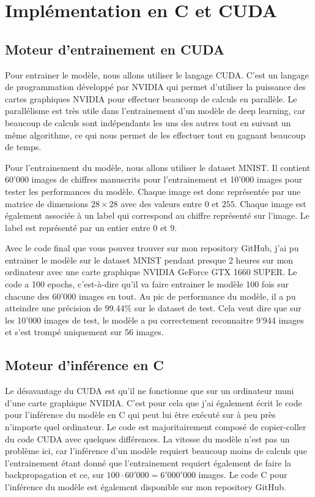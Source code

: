 \documentclass{article}
\begin{document}
\section{Implémentation en C et CUDA}

\subsection{Moteur d'entrainement en CUDA}

Pour entrainer le modèle, nous allons utiliser le langage CUDA. C'est un langage de programmation développé par NVIDIA qui permet d'utiliser la puissance des cartes graphiques NVIDIA pour effectuer beaucoup de calculs en parallèle. Le parallélisme est très utile dans l'entrainement d'un modèle de deep learning, car beaucoup de calculs sont indépendants les uns des autres tout en suivant un même algorithme, ce qui nous permet de les effectuer tout en gagnant beaucoup de temps.

\medskip

Pour l'entrainement du modèle, nous allons utiliser le dataset MNIST. Il contient 60'000 images de chiffres manuscrits pour l'entrainement et 10'000 images pour tester les performances du modèle. Chaque image est donc représentée par une matrice de dimensions $28 \times 28$ avec des valeurs entre $0$ et $255$. Chaque image est également associée à un label qui correspond au chiffre représenté sur l'image. Le label est représenté par un entier entre $0$ et $9$.

\medskip

Avec le code final que vous pouvez trouver sur mon repository GitHub, j'ai pu entrainer le modèle sur le dataset MNIST pendant presque 2 heures sur mon ordinateur avec une carte graphique NVIDIA GeForce GTX 1660 SUPER. Le code a 100 epochs, c'est-à-dire qu'il va faire entrainer le modèle 100 fois sur chacune des 60'000 images en tout. Au pic de performance du modèle, il a pu atteindre une précision de 99.44\% sur le dataset de test. Cela veut dire que sur les 10'000 images de test, le modèle a pu correctement reconnaitre 9'944 images et s'est trompé uniquement sur 56 images.

\subsection{Moteur d'inférence en C}

Le désavantage du CUDA est qu'il ne fonctionne que sur un ordinateur muni d'une carte graphique NVIDIA. C'est pour cela que j'ai également écrit le code pour l'inférence du modèle en C qui peut lui être exécuté sur à peu près n'importe quel ordinateur. Le code est majoritairement composé de copier-coller du code CUDA avec quelques différences. La vitesse du modèle n'est pas un problème ici, car l'inférence d'un modèle requiert beaucoup moins de calculs que l'entrainement étant donné que l'entrainement requiert également de faire la backpropagation et ce, sur $100 \cdot 60'000 = 6'000'000$ images. Le code C pour l'inférence du modèle est également disponible sur mon repository GitHub.
\end{document}
